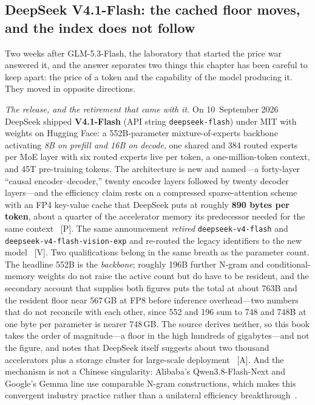 \subsection{DeepSeek V4.1-Flash: the cached floor moves, and the index does not follow}
\label{sec:v41flash}

Two weeks after GLM-5.3-Flash, the laboratory that started the price war answered it, and the answer separates two things this chapter has been careful to keep apart: the price of a token and the capability of the model producing it. They moved in opposite directions.

\emph{The release, and the retirement that came with it.} On 10~September 2026 DeepSeek shipped \textbf{V4.1-Flash} (API string \texttt{deepseek-flash}) under MIT with weights on Hugging Face: a 552B-parameter mixture-of-experts backbone activating \emph{8B on prefill and 16B on decode}, one shared and 384 routed experts per MoE layer with six routed experts live per token, a one-million-token context, and 45T pre-training tokens. The architecture is new and named---a forty-layer ``causal encoder--decoder,'' twenty encoder layers followed by twenty decoder layers---and the efficiency claim rests on a compressed sparse-attention scheme with an FP4 key-value cache that DeepSeek puts at roughly \textbf{890 bytes per token}, about a quarter of the accelerator memory its predecessor needed for the same context~\cite{deepseek-v41flash} [P]. The same announcement \emph{retired} \texttt{deepseek-v4-flash} and \texttt{deepseek-v4-flash-vision-exp} and re-routed the legacy identifiers to the new model~\cite{deepseek-v41flash-updates} [V]. Two qualifications belong in the same breath as the parameter count. The headline 552B is the \emph{backbone}; roughly 196B further N-gram and conditional-memory weights do not raise the active count but do have to be resident, and the secondary account that supplies both figures puts the total at about 763B and the resident floor near 567\,GB at FP8 before inference overhead---two numbers that do not reconcile with each other, since 552 and 196 sum to 748 and 748B at one byte per parameter is nearer 748\,GB. The source derives neither, so this book takes the order of magnitude---a floor in the high hundreds of gigabytes---and not the figure, and notes that DeepSeek itself suggests about two thousand accelerators plus a storage cluster for large-scale deployment~\cite{deepseek-v41flash-register} [A]. And the mechanism is not a Chinese singularity: Alibaba's Qwen3.8-Flash-Next and Google's Gemma line use comparable N-gram constructions, which makes this convergent industry practice rather than a unilateral efficiency breakthrough~\cite{deepseek-v41flash-register}.

